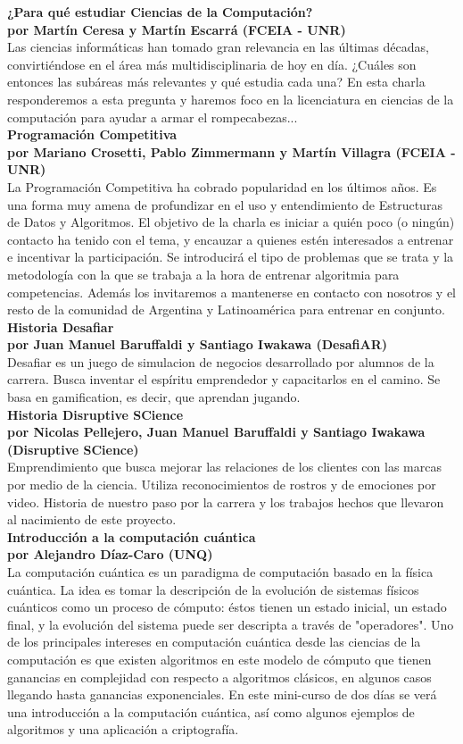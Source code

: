 \documentclass[12pt, a4paper]{article}
\newcommand{\charla}[3]{
	{\large\bf#1}\\
	{\bf por #2}\\
	#3\\
}
\begin{document}
\charla
{¿Para qué estudiar Ciencias de la Computación?}
{Martín Ceresa y Martín Escarrá (FCEIA - UNR)}
{Las ciencias informáticas han tomado gran relevancia en las últimas décadas,
convirtiéndose en el área más multidisciplinaria de hoy en día. ¿Cuáles son
entonces las subáreas más relevantes y qué estudia cada una? En esta charla
responderemos a esta pregunta y haremos foco en la licenciatura en ciencias
de la computación para ayudar a armar el rompecabezas...}

\charla
{Programación Competitiva}
{Mariano Crosetti, Pablo Zimmermann y Martín Villagra (FCEIA - UNR)}
{La Programación Competitiva ha cobrado popularidad en los últimos años. Es una forma muy amena de profundizar en el uso y entendimiento de Estructuras de Datos y Algoritmos. El objetivo de la charla es iniciar a quién poco (o ningún) contacto ha tenido con el tema, y encauzar a quienes estén interesados a entrenar e incentivar la participación. Se introducirá el tipo de problemas que se trata y la metodología con la que se trabaja a la hora de entrenar algoritmia para competencias. Además los invitaremos a mantenerse en contacto con nosotros y el resto de la comunidad de Argentina y Latinoamérica para entrenar en conjunto.}

\charla
{Historia Desafiar}
{Juan Manuel Baruffaldi y Santiago Iwakawa (DesafiAR)}
{Desafiar es un juego de simulacion de negocios desarrollado por alumnos de la carrera. Busca inventar el espíritu emprendedor y capacitarlos en el camino. Se basa en gamification, es decir, que aprendan jugando.}

\charla
{Historia Disruptive SCience}
{Nicolas Pellejero, Juan Manuel Baruffaldi y Santiago Iwakawa (Disruptive SCience)}
{Emprendimiento que busca mejorar las relaciones de los clientes con las marcas por medio de la ciencia. Utiliza reconocimientos de rostros y de emociones por video. Historia de nuestro paso por la carrera y los trabajos hechos que llevaron al nacimiento de este proyecto.}

\charla
{Introducción a la computación cuántica}
{Alejandro Díaz-Caro (UNQ)}
{La computación cuántica es un paradigma de computación basado en la física cuántica. La idea es tomar la descripción de la evolución de sistemas físicos cuánticos como un proceso de cómputo: éstos tienen un estado inicial, un estado final, y la evolución del sistema puede ser descripta a través de "operadores". Uno de los principales intereses en computación cuántica desde las ciencias de la computación es que existen algoritmos en este modelo de cómputo que tienen ganancias en complejidad con respecto a algoritmos clásicos, en algunos casos llegando hasta ganancias exponenciales. En este mini-curso de dos días se verá una introducción a la computación cuántica, así como algunos ejemplos de algoritmos y una aplicación a criptografía.}
\end{document}
